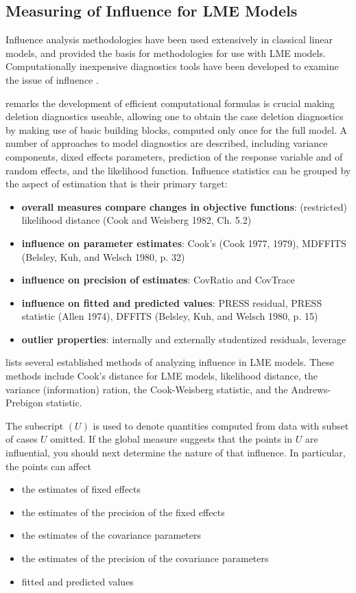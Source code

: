 \documentclass[12pt, a4paper]{report}
\theoremstyle{plain}
\theoremstyle{definition}
\theoremstyle{remark}
\begin{document}
\subsection{Measuring of Influence for LME Models}
Influence analysis methodologies have been used extensively in classical linear models, and provided the basis for methodologies for use with LME models. Computationally inexpensive diagnostics tools have been developed to examine the issue of influence \citep{Zewotir}. 


\citet{Zewotir} remarks the development of efficient computational formulas is crucial making deletion diagnostics useable, allowing one to obtain the  case deletion diagnostics by making use of basic building blocks, computed only once for the full model. A number of approaches to model diagnostics are described, including variance components, dixed effects parameters, prediction of the response variable and of random effects, and the likelihood function. Influence statistics can be grouped by the aspect of estimation that is their primary target:
\begin{itemize}
	\item \textbf{overall measures compare changes in objective functions}: (restricted) likelihood distance (Cook and Weisberg 1982, Ch. 5.2)
	\item \textbf{influence on parameter estimates}: Cook's  (Cook 1977, 1979), MDFFITS (Belsley, Kuh, and Welsch 1980, p. 32)
	\item \textbf{influence on precision of estimates}: CovRatio and CovTrace
	\item \textbf{influence on fitted and predicted values}: PRESS residual, PRESS statistic (Allen 1974), DFFITS (Belsley, Kuh, and Welsch 1980, p. 15)
	\item \textbf{outlier properties}: internally and externally studentized residuals, leverage
\end{itemize}


\citet{Zewotir} lists several established methods of analyzing influence in LME models. These methods include Cook's distance for LME models,
 likelihood distance,
the variance (information) ration,
the  Cook-Weisberg statistic, and
the  Andrews-Prebigon statistic.

The subscript $(U)$ is used to denote quantities computed from data with subset of cases $U$ omitted.
If the global measure suggests that the points in $U$ are influential, you should next determine the nature of
that influence. In particular, the points can affect
\begin{itemize}
	\item the estimates of fixed effects
	\item the estimates of the precision of the fixed effects
	\item the estimates of the covariance parameters
	\item the estimates of the precision of the covariance parameters
	\item fitted and predicted values
\end{itemize}	
\end{document}
